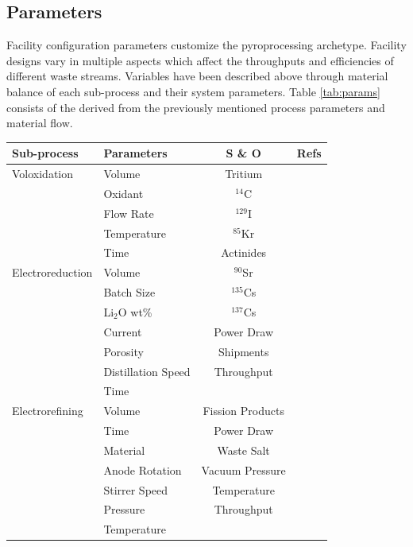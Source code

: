 \documentclass{anstrans}
\begin{document}
\subsection{Parameters}
Facility configuration parameters customize the pyroprocessing archetype. Facility designs vary in 
multiple aspects which affect the throughputs and efficiencies of different waste streams. Variables have been described above through material balance of each sub-process and their system parameters. Table \ref{tab:params} consists of the  derived from the previously mentioned process parameters and material flow. 

\begin{table}[h]
	\centering
	\begin{tabularx}{0.5\textwidth}{llcr}
		\hline
		\textbf{Sub-process} & \textbf{Parameters} & \textbf{S \& O} & \textbf{Refs} \\
		\hline
		Voloxidation & Volume & Tritium & \cite{jubin_spent_2009} \\
		& Oxidant & $^{14}$C & \cite{flowsheet_1998} \\
		& Flow Rate &  $^{129}$I &  \\
		& Temperature & $^{85}$Kr &  \\
		& Time & Actinides & \\ \hline
		Electroreduction & Volume & $^{90}$Sr & \cite{Borrelli_2017} \\
		& Batch Size & $^{135}$Cs & \cite{flowsheet_1998} \\
		& Li$_2$O wt\% & $^{137}$Cs & \cite{choi_electrochemical_2015} \\
		& Current & Power Draw & \cite{lee_korean_2011} \\
		& Porosity & Shipments & \cite{lee_modeling_2016} \\
		& Distillation Speed & Throughput & \\ 
		& Time & & \\ \hline
		Electrorefining & Volume & Fission Products & \cite{lee_advanced_2008} \\
		& Time & Power Draw & \cite{lee_korean_2011} \\
		& Material & Waste Salt & \cite{flowsheet_1998} \\
		& Anode Rotation & Vacuum Pressure & \cite{koyama_development_2012} \\
		& Stirrer Speed & Temperature & \cite{kim_development_2013} \\
		& Pressure & Throughput & \\
		& Temperature & & \\ \hline

\end{tabularx}
\end{table}
\end{document}
